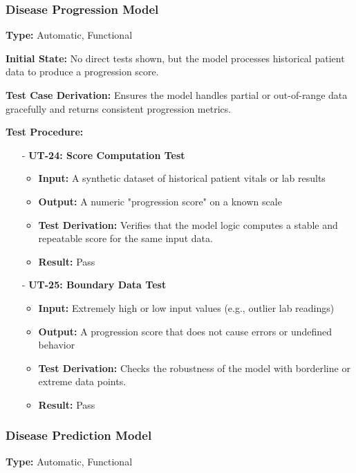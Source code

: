 \documentclass[12pt, titlepage]{article}
\begin{document}
\subsubsection{Disease Progression Model}
\textbf{Type:} Automatic, Functional
\vspace{10pt}

\noindent \textbf{Initial State:}
No direct tests shown, but the model processes historical patient data to produce a progression score.
\vspace{10pt}

\noindent \textbf{Test Case Derivation:}
Ensures the model handles partial or out-of-range data gracefully and returns consistent progression metrics.
\vspace{10pt}

\noindent \textbf{Test Procedure:}
\begin{itemize}
   \item[-] \textbf{UT-24: Score Computation Test} \label{test:progression-score-compute}
   \begin{itemize}
     \item \textbf{Input:} A synthetic dataset of historical patient vitals or lab results
     \item \textbf{Output:} A numeric "progression score" on a known scale
     \item \textbf{Test Derivation:} Verifies that the model logic computes a stable and repeatable score for the same input data.
     \item \textbf{Result:} Pass
   \end{itemize}

   \item[-] \textbf{UT-25: Boundary Data Test} \label{test:progression-boundary}
   \begin{itemize}
     \item \textbf{Input:} Extremely high or low input values (e.g., outlier lab readings)
     \item \textbf{Output:} A progression score that does not cause errors or undefined behavior
     \item \textbf{Test Derivation:} Checks the robustness of the model with borderline or extreme data points.
     \item \textbf{Result:} Pass
   \end{itemize}
\end{itemize}
\vspace{10pt}


\subsubsection{Disease Prediction Model}
\textbf{Type:} Automatic, Functional
\vspace{10pt}
\end{document}
